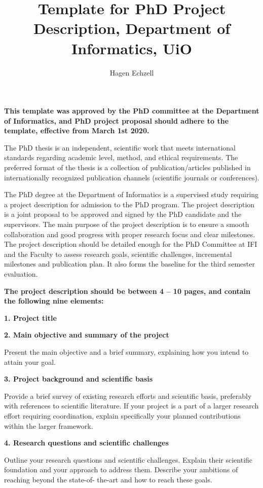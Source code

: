 \documentclass{article}
\title{Template for PhD Project Description, Department of Informatics, UiO}
\author{Hagen Echzell}
\begin{document}
\maketitle

\textbf{This template was approved by the PhD committee at the Department of Informatics, and PhD project proposal should adhere to the template, effective from March 1st 2020.}

The PhD thesis is an independent, scientific work that meets international standards regarding academic level, method, and ethical requirements. The preferred format of the thesis is a collection of publication/articles published in internationally recognized publication channels (scientific journals or conferences).

The PhD degree at the Department of Informatics is a supervised study requiring a project description for admission to the PhD program. The project description is a joint proposal to be approved and signed by the PhD candidate and the supervisors. The main purpose of the project description is to ensure a smooth collaboration and good progress with proper research focus and clear milestones. The project description should be detailed enough for the PhD Committee at IFI and the Faculty to assess research goals, scientific challenges, incremental milestones and publication plan. It also forms the baseline for the third semester evaluation.

\textbf{The project description should be between 4 – 10 pages, and contain the following nine elements:}

\textbf{1. Project title}

\textbf{2. Main objective and summary of the project}

Present the main objective and a brief summary, explaining how you intend to attain your goal.

\textbf{3. Project background and scientific basis}

Provide a brief survey of existing research efforts and scientific basis, preferably with references to scientific literature. If your project is a part of a larger research effort requiring coordination, explain specifically your planned contributions within the larger framework.

\textbf{4. Research questions and scientific challenges}

Outline your research questions and scientific challenges. Explain their scientific foundation and your approach to address them. Describe your ambitions of reaching beyond the state-of- the-art and how to reach these goals.
\end{document}
